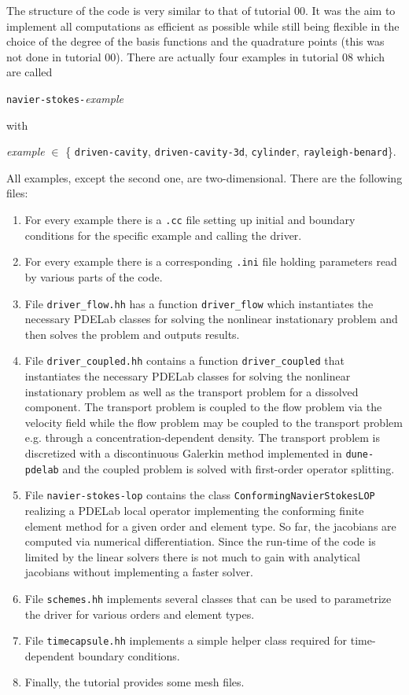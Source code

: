 \documentclass[a4paper,12pt]{article}
\theoremstyle{definition}
\begin{document}
The structure of the code is very similar to that of tutorial 00. It was the aim to implement all computations
as efficient as possible while still being flexible in the choice of the degree of the basis functions and
the quadrature points (this was not done in tutorial 00). 
There are actually four examples in tutorial 08 which are called
\begin{center}
\lstinline{navier-stokes-}\textit{example}
\end{center}
with
\begin{center}
\textit{example} $\in$ \{ \lstinline{driven-cavity}, \lstinline{driven-cavity-3d}, \lstinline{cylinder}, \lstinline{rayleigh-benard}\}.
\end{center}
All examples, except the second one, are two-dimensional.
There are the following files:
\begin{enumerate}[1)]
\item For every example there is a \lstinline{.cc} file setting up initial and boundary conditions for the
specific example and calling the driver.
\item For every example there is a corresponding \lstinline{.ini} file holding parameters read by various parts of the code.
\item File \lstinline{driver_flow.hh} has a function \lstinline{driver_flow} which instantiates the necessary PDELab classes 
for solving the nonlinear instationary problem and then solves the problem and outputs results.
\item File \lstinline{driver_coupled.hh} contains a function \lstinline{driver_coupled} that instantiates the necessary PDELab classes 
for solving the nonlinear instationary problem as well as the transport problem for a dissolved component.
The transport problem is coupled to the flow problem via the velocity field while the flow problem
may be coupled to the transport problem e.g. through a concentration-dependent density. The transport problem 
is discretized with a discontinuous Galerkin method implemented in \lstinline{dune-pdelab} and the coupled
problem is solved with first-order operator splitting.
\item File \lstinline{navier-stokes-lop} contains the class
\lstinline{ConformingNavierStokesLOP} realizing a PDELab local operator implementing
the conforming finite element method for a given order and element type.
So far, the jacobians are computed via numerical differentiation. Since the
run-time of the code is limited by the linear solvers there is not much to gain
with analytical jacobians without implementing a faster solver.
\item File \lstinline{schemes.hh} implements several classes that can be used to parametrize the driver for various orders
and element types. 
\item File \lstinline{timecapsule.hh} implements a simple helper class required for time-dependent boundary conditions.
\item Finally, the tutorial provides some mesh files.
\end{enumerate}
\end{document}
